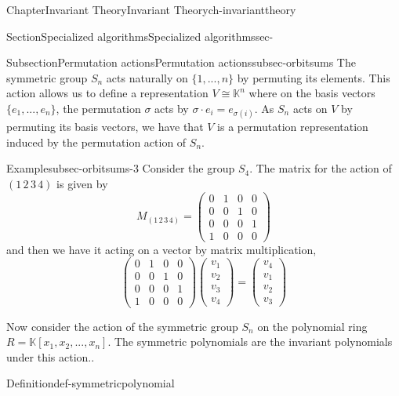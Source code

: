 \documentclass[oneside,10pt,]{book}
\newcommand{\amp}{&}
\begin{document}
\begin{chapterptx}{Chapter}{Invariant Theory}{}{Invariant Theory}{}{}{ch-invarianttheory}
\begin{sectionptx}{Section}{Specialized algorithms}{}{Specialized algorithms}{}{}{sec-}
%
\begin{subsectionptx}{Subsection}{Permutation actions}{}{Permutation actions}{}{}{subsec-orbitsums}
The symmetric group \(S_n \) acts naturally on \(\{1, ... , n\}\) by permuting its elements. This action allows us to define a representation \(V \cong \mathbb{K}^n\) where on the basis vectors \(\{e_1, ... , e_n\}\), the permutation \(\sigma\) acts by \(\sigma \cdot e_i = e_{\sigma(i)}\). As \(S_n \) acts on \(V\) by permuting its basis vectors, we have that \(V\) is a permutation representation induced by the permutation action of \(S_n\).%
\begin{example}{Example}{}{subsec-orbitsums-3}%
Consider the group \(S_4\). The matrix for the action of \((1 \,2\,3\,4) \) is given by%
\begin{equation*}
M_{(1 \,2\,3\,4)} =  \begin{pmatrix}
0 \amp 1 \amp 0 \amp 0 \\
0 \amp 0 \amp 1 \amp 0 \\
0 \amp 0 \amp 0 \amp 1 \\
1 \amp 0 \amp 0 \amp 0 
\end{pmatrix}   
\end{equation*}
and then we have it acting on a vector by matrix multiplication,%
\begin{equation*}
\begin{pmatrix}
0 \amp 1 \amp 0 \amp 0 \\
0 \amp 0 \amp 1 \amp 0 \\
0 \amp 0 \amp 0 \amp 1 \\
1 \amp 0 \amp 0 \amp 0 
\end{pmatrix} \begin{pmatrix}
v_1 \\
v_2 \\
v_3\\
v_4
\end{pmatrix}   =    \begin{pmatrix}
v_4 \\
v_1 \\
v_2\\
v_3
\end{pmatrix}
\end{equation*}
%
\end{example}
Now consider the action of the symmetric group \(S_n\) on the polynomial ring \(R=\mathbb{K}[x_1,x_2,...,x_n]\). The symmetric polynomials are the invariant polynomials under this action..%
\begin{definition}{Definition}{}{def-symmetricpolynomial}%

\end{definition}
\end{subsectionptx}
\end{sectionptx}
\end{chapterptx}
\end{document}
